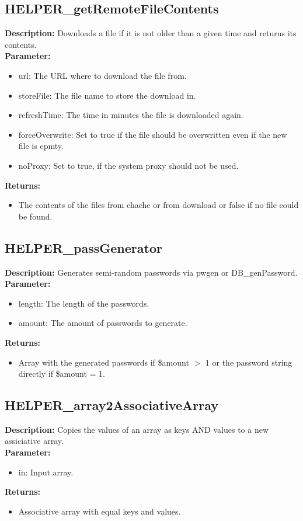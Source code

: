 \subsection{HELPER\_getRemoteFileContents}
\textbf{Description:} Downloads a file if it is not older than a given time and returns its contents.\\
\textbf{Parameter:}
\begin{itemize}
\item url: The URL where to download the file from.
\item storeFile: The file name to store the download in.
\item refreshTime: The time in minutes the file is downloaded again.
\item forceOverwrite: Set to true if the file should be overwritten even if the new file is epmty.
\item noProxy: Set to true, if the system proxy should not be used.
\end{itemize}
\textbf{Returns:}
\begin{itemize}
\item The contents of the files from chache or from download or false if no file could be found.
\end{itemize}

\subsection{HELPER\_passGenerator}
\textbf{Description:} Generates semi-random passwords via pwgen or DB\_genPassword.\\
\textbf{Parameter:}
\begin{itemize}
\item length: The length of the passwords.
\item amount: The amount of passwords to generate.
\end{itemize}
\textbf{Returns:}
\begin{itemize}
\item Array with the generated passwords if \$amount $>$ 1 or the password string directly if \$amount = 1.
\end{itemize}

\subsection{HELPER\_array2AssociativeArray}
\textbf{Description:} Copies the values of an array as keys AND values to a new assiciative array.\\
\textbf{Parameter:}
\begin{itemize}
\item in: Input array.
\end{itemize}
\textbf{Returns:}
\begin{itemize}
\item Associative array with equal keys and values.
\end{itemize}

